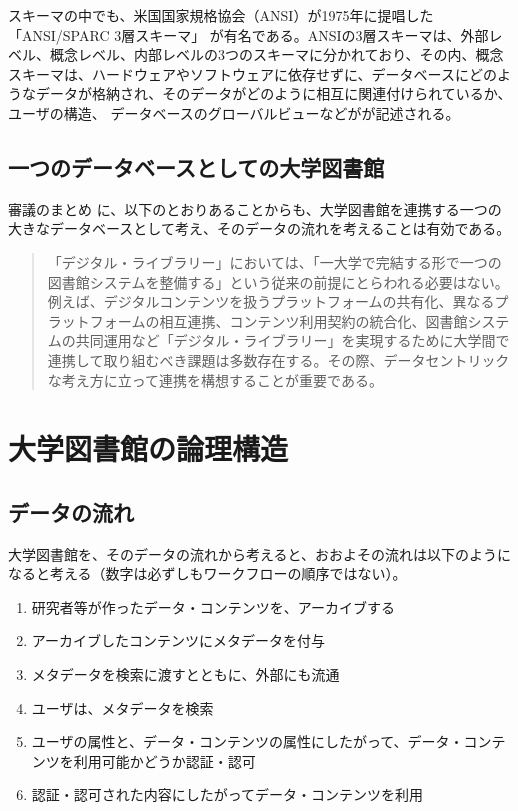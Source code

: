 \documentclass[submit,noauthor]{ono}
\begin{document}
スキーマの中でも、米国国家規格協会（ANSI）が1975年に提唱した「ANSI/SPARC 3層スキーマ」\cite{ansi} が有名である。ANSIの3層スキーマは、外部レベル、概念レベル、内部レベルの3つのスキーマに分かれており、その内、概念スキーマは、ハードウェアやソフトウェアに依存せずに、データベースにどのようなデータが格納され、そのデータがどのように相互に関連付けられているか、ユーザの構造、	データベースのグローバルビューなどがが記述される。

	\subsection{一つのデータベースとしての大学図書館}

審議のまとめ \cite{まとめ} に、以下のとおりあることからも、大学図書館を連携する一つの大きなデータベースとして考え、そのデータの流れを考えることは有効である。

\begin{quote}
「デジタル・ライブラリー」においては、「一大学で完結する形で一つの図書館システムを整備する」という従来の前提にとらわれる必要はない。例えば、デジタルコンテンツを扱うプラットフォームの共有化、異なるプラットフォームの相互連携、コンテンツ利用契約の統合化、図書館システムの共同運用など「デジタル・ライブラリー」を実現するために大学間で連携して取り組むべき課題は多数存在する。その際、データセントリックな考え方に立って連携を構想することが重要である。
\end{quote}

\section{大学図書館の論理構造}

\subsection{データの流れ}

大学図書館を、そのデータの流れから考えると、おおよその流れは以下のようになると考える（数字は必ずしもワークフローの順序ではない）。

\begin{enumerate}
  \item 研究者等が作ったデータ・コンテンツを、アーカイブする
	\item アーカイブしたコンテンツにメタデータを付与
  \item メタデータを検索に渡すとともに、外部にも流通
  \item ユーザは、メタデータを検索
  \item ユーザの属性と、データ・コンテンツの属性にしたがって、データ・コンテンツを利用可能かどうか認証・認可
  \item 認証・認可された内容にしたがってデータ・コンテンツを利用
\end{enumerate}
\end{document}
